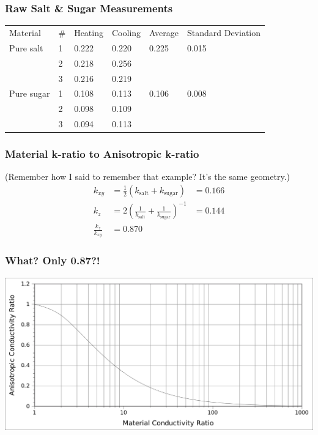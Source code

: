 \documentclass{beamer}
\begin{document}
\begin{frame}
\frametitle{Raw Salt \& Sugar Measurements}
\begin{table}
\begin{tabular}{l l | l l | l l}
Material & \# & Heating & Cooling & Average & Standard Deviation\\
Pure salt & 1 & 0.222 & 0.220 & 0.225 & 0.015\\
 & 2 & 0.218 & 0.256 &  & \\
 & 3 & 0.216 & 0.219 &  & \\
Pure sugar & 1 & 0.108 & 0.113 & 0.106 & 0.008\\
 & 2 & 0.098 & 0.109 &  & \\
 & 3 & 0.094 & 0.113 &  & \\
\end{tabular}
\end{table}
\end{frame}


\begin{frame}
\frametitle{Material k-ratio to Anisotropic k-ratio}
(Remember how I said to remember that example? It's the same geometry.)
\begin{align*}
k_{xy} &= \frac12 \left( k_{\textrm{salt}} + k_{\textrm{sugar}} \right) &= \boxed{0.166}\\
k_z &= 2 \left( \frac1{k_{\textrm{salt}}} + \frac1{k_{\textrm{sugar}}} \right)^{-1} &= \boxed{0.144}\\
\frac{k_z}{k_{xy}} &= \boxed{0.870}
\end{align*}
\end{frame}


\begin{frame}
\frametitle{What? Only 0.87?!}
\begin{center}
\includegraphics[width=\textwidth]{fig/anisovmaterial_ratios.png}
\end{center}
\end{frame}
\end{document}
